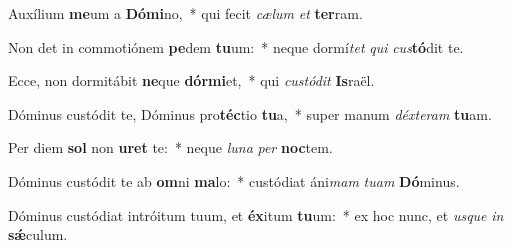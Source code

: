 \item Auxílium \textbf{me}um a \textbf{Dó}\textbf{mi}no,~* qui fecit \textit{cæ}\textit{lum} \textit{et} \textbf{ter}ram.
\item Non det in commotiónem \textbf{pe}dem \textbf{tu}um:~* neque dormí\textit{tet} \textit{qui} \textit{cus}\textbf{tó}dit te.
\item Ecce, non dormitábit \textbf{ne}que \textbf{dór}\textbf{mi}et,~* qui \textit{cus}\textit{tó}\textit{dit} \textbf{Is}raël.
\item Dóminus custódit te, Dóminus pro\textbf{téc}tio \textbf{tu}a,~* super manum \textit{déx}\textit{te}\textit{ram} \textbf{tu}am.
\item Per diem \textbf{sol} non \textbf{u}\textbf{ret} te:~* neque \textit{lu}\textit{na} \textit{per} \textbf{noc}tem.
\item Dóminus custódit te ab \textbf{om}ni \textbf{ma}lo:~* custódiat áni\textit{mam} \textit{tu}\textit{am} \textbf{Dó}minus.
\item Dóminus custódiat intróitum tuum, et \textbf{éx}itum \textbf{tu}um:~* ex hoc nunc, et \textit{us}\textit{que} \textit{in} \textbf{sǽ}culum.
